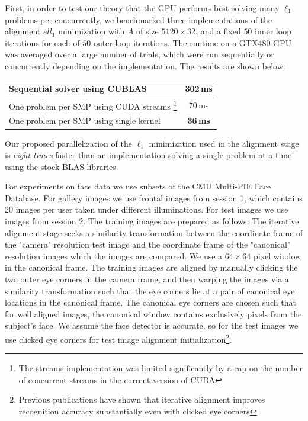 \documentclass[10pt,twocolumn,letterpaper]{article}
\begin{document}
First, in order to test our theory that the GPU performs best solving many
$\ell_1$ problems-per concurrently, we benchmarked three implementations of the
alignment $ell_1$ minimization with $A$ of size $5120 \times 32$, and a fixed
$50$ inner loop iterations for each of $50$ outer loop iterations. The runtime
on a GTX480 GPU was averaged over a large number of trials, which were run
sequentially or concurrently depending on the implementation.
The results are shown below:
\begin{tabular}{|l|c|}
\hline
Sequential solver using CUBLAS & 302\,ms \\
\hline
One problem per SMP using CUDA streams 
\footnote{The streams implementation was limited significantly by a 
cap on the number of concurrent streams in the current version of CUDA}
& 70\,ms \\
\hline
One problem per SMP using single kernel & {\bf 36\,ms} \\
\hline
\end{tabular}
Our proposed parallelization of the $\ell_1$ minimization used in the alignment
stage is {\em eight times} faster than an implementation solving a single
problem at a time using the stock BLAS libraries.
 
For experiments on face data we use subsets of the CMU Multi-PIE Face Database.
For gallery images we use frontal images from session 1, which contains 20
images per user taken under different illuminations. For test images we use
images from session 2.  The training images are prepared as follows:
The iterative alignment stage seeks a similarity
transformation between the coordinate frame of the "camera" resolution test
image and the coordinate frame of the "canonical" resolution images which the
images are compared.  We use a $64 \times 64$ pixel window in the canonical
frame.  The training images are aligned by manually clicking the two outer eye
corners in the camera frame, and then warping the images via a similarity
transformation such that the eye corners lie at a pair of canonical eye
locations in the canonical frame.  The canonical eye corners are chosen such
that for well aligned images, the canonical window contains exclusively pixels
from the subject's face.  We assume the face detector is accurate, so for the test
images we use clicked eye corners for test image alignment initialization\footnote{Previous
publications have shown that iterative alignment improves recognition accuracy substantially
even with clicked eye corners}.
\end{document}

